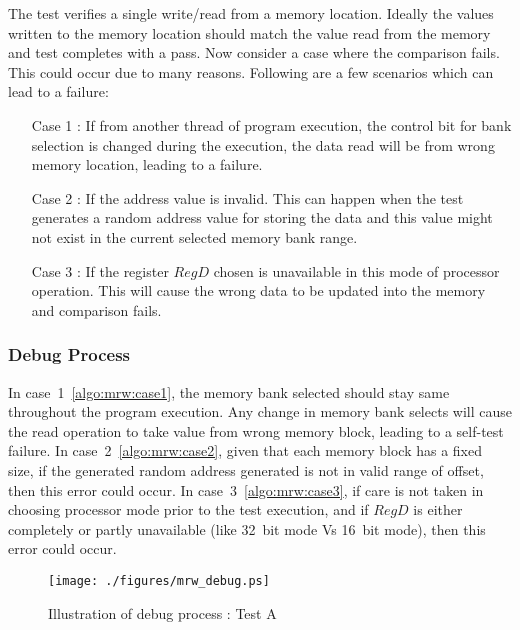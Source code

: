 The test verifies a single write/read from a memory location. Ideally the values written to the memory location should match the value read from the memory and test completes with a pass. Now consider a case where the comparison fails. This could occur due to many reasons. Following are a few scenarios which can lead to a failure:
\begin{itemize}
\item [Case 1]: If from another thread of program execution, the control bit for bank selection is changed during the execution, the data read will be from wrong memory location, leading to a failure. \label{algo:mrw:case1}

\item [Case 2]: If the address value is invalid. This can happen when the test generates a random address value for storing the data and this value might not exist in the current selected memory bank range. \label{algo:mrw:case2}

\item [Case 3]:  If the register $Reg D$ chosen is unavailable in this mode of processor operation. This will cause the wrong data to be updated into the memory and comparison fails. \label{algo:mrw:case3}
\end{itemize}

\subsubsection{Debug Process}
In case~1~\ref{algo:mrw:case1}, the memory bank selected should stay same throughout the program execution. Any change in memory bank selects will cause the read operation to take value from wrong memory block, leading to a self-test failure.
In case~2~\ref{algo:mrw:case2}, given that each memory block has a fixed size, if the generated random address generated is not in valid range of offset, then this error could occur.
In case~3~\ref{algo:mrw:case3}, if care is not taken in choosing processor mode prior to the test execution, and if $Reg D$ is either completely or partly unavailable (like 32~bit mode Vs 16~bit mode), then this error could occur.

\begin{figure}[h]
\centering
\texttt{[image: ./figures/mrw\_debug.ps]}
\caption{Illustration of debug process : Test A} 
\label{fig:mrw_debug.ps}
\end{figure}

